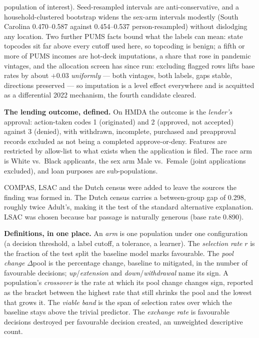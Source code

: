 \documentclass[conference]{IEEEtran}
\begin{document}
population of interest). Seed-resampled intervals are anti-conservative, and a
household-clustered bootstrap widens the sex-arm intervals modestly (South Carolina
0.470--0.587 against 0.454--0.537 person-resampled) without dislodging any location.
Two further PUMS facts bound what the labels can mean: state topcodes sit far above
every cutoff used here, so topcoding is benign; a fifth or more of PUMS incomes are
hot-deck imputations, a share that rose in pandemic vintages, and the allocation screen
has since run: excluding flagged rows lifts base rates by about $+0.03$
\emph{uniformly} --- both vintages, both labels, gaps stable, directions preserved ---
so imputation is a level effect everywhere and is acquitted as a differential 2022
mechanism, the fourth candidate cleared.

\textbf{The lending outcome, defined.} On HMDA the outcome is the \emph{lender's}
approval: action-taken codes 1 (originated) and 2 (approved, not accepted) against 3
(denied), with withdrawn, incomplete, purchased and preapproval records excluded as not being
a completed approve-or-deny. Features are restricted by allow-list to what exists when the
application is filed. The race arm is White vs.\ Black applicants, the sex arm Male vs.\
Female (joint applications excluded), and loan purposes are sub-populations.

COMPAS, LSAC and the Dutch census were added to leave the sources the finding was formed
in. The Dutch census
carries a between-group gap of 0.298, roughly twice Adult's, making it the test of the standard
alternative explanation. LSAC was chosen because bar passage is naturally generous (base rate
0.890).

\textbf{Definitions, in one place.} An \emph{arm} is one population under one
configuration (a decision threshold, a label cutoff, a tolerance, a learner). The
\emph{selection rate} $r$ is the fraction of the test split the baseline model marks
favourable. The \emph{pool change} $\Delta$pool is the percentage change, baseline to
mitigated, in the number of favourable decisions; \emph{up}/\emph{extension} and
\emph{down}/\emph{withdrawal} name its sign. A population's \emph{crossover} is the rate
at which its pool change changes sign, reported as the bracket between the highest rate
that still shrinks the pool and the lowest that grows it. The \emph{viable band} is the
span of selection rates over which the baseline stays above the trivial predictor. The
\emph{exchange rate} is favourable decisions destroyed per favourable decision created,
an unweighted descriptive count.
\end{document}
